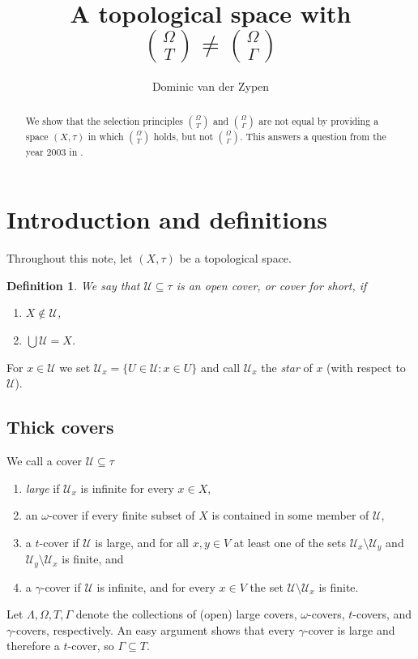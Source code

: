 \documentclass[12pt]{amsart}
\newtheorem{definition}[lemma]{\bf Definition}
\gdef\cal{\mathcal}
\begin{document}
\title{A topological space with
  ${\Omega \choose T}\neq {\Omega \choose \Gamma}$}
\author{Dominic van der Zypen}
\address{Federal Office of Borders and Customs Security,
Taubenstrasse 16, CH-3003 Bern, Switzerland}

\begin{abstract}
We show that the selection principles ${\Omega\choose T}$
and ${\Omega\choose\Gamma}$ are not equal by providing
a space $(X,\tau)$ in which ${\Omega \choose T}$ holds,
but not ${\Omega \choose \Gamma}$. This answers a
question from the year $2003$ in \cite{spm}.
\end{abstract}

\maketitle
\section{Introduction and definitions}
Throughout this note, let $(X,\tau)$ be a topological space.
\begin{definition} \label{cov}
 We say that ${\cal U} \subseteq \tau$ is an {\em open cover}, or
  {\em cover} for short, if \begin{enumerate}
    \item $X\notin {\cal U}$,
    \item $\bigcup {\cal U} = X$.
  \end{enumerate}
\end{definition}
For $x\in {\cal U}$ we set ${\cal U}_x = \{U \in {\cal U}:
x\in U\}$ and call ${\cal U}_x$ the
{\em star} of $x$ (with respect to ${\cal U}$).
\subsection{Thick covers} We call a cover ${\cal U}\subseteq \tau$
\begin{enumerate}
  \item {\em large} if ${\cal U}_x$ is infinite for every $x\in X$,
  \item an $\omega$-cover if every finite subset of $X$ is contained
    in some member of ${\cal U}$,
  \item a $t$-cover if ${\cal U}$ is large, and
    for all $x,y\in V$ at least one of the
    sets ${\cal U}_x\setminus {\cal U}_y$ and ${\cal U}_y\setminus
    {\cal U}_x$ is finite, and
  \item a $\gamma$-cover if ${\cal U}$ is infinite, and
    for every $x\in V$ the set ${\cal U}
    \setminus {\cal U}_x$ is finite.
\end{enumerate}
Let $\Lambda, \Omega, T, \Gamma$ denote the collections
of (open) large covers, $\omega$-covers, $t$-covers, and $\gamma$-covers,
respectively. An easy argument shows that every $\gamma$-cover is
large and therefore a $t$-cover, so $\Gamma \subseteq T$.
\end{document}
